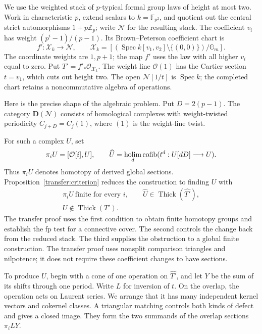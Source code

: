\documentclass[11pt]{article}
\DeclareMathOperator{\Thick}{Thick}
\DeclareMathOperator{\Spec}{Spec}
\newcommand{\Z}{\mathbb Z}
\newcommand{\F}{\mathbb F}
\theoremstyle{definition}
\theoremstyle{remark}
\numberwithin{equation}{section}
\begin{document}
We use the weighted stack of $p$-typical formal group laws of height at
most two. Work in characteristic $p$, extend scalars to $k=\F_{p^2}$,
and quotient out the central strict automorphisms $1+p\Z_p$; write
$\mathcal N$ for the resulting stack. The coefficient $v_i$ has weight
$(p^i-1)/(p-1)$. Its Brown--Peterson coefficient chart is
\[
 f':\mathcal X_k\longrightarrow\mathcal N,\qquad
 \mathcal X_k=
 [ (\Spec k[v_1,v_2]\setminus\{(0,0)\})/\mathbb G_m ].
\]
The coordinate weights are $1,p+1$; the map $f'$ uses the law with
all higher $v_i$ equal to zero.
Put $T'=f'_*\mathcal O_{\mathcal X_k}$.
The weight line $\mathcal O(1)$ has the Cartier section $t=v_1$, which cuts
out height two. The open $\mathcal N[1/t]$ is $\Spec k$;
the completed chart retains a noncommutative algebra of operations.

Here is the precise shape of the algebraic problem. Put $D=2(p-1)$.
The category $\mathbf D(\mathcal N)$ consists of homological complexes
with weight-twisted periodicity $C_{j+D}=C_j(1)$, where $(1)$ is the
weight-line twist.

For such a complex $U$, set
\[
 \pi_iU=[\mathcal O[i],U],\qquad
 \widehat U=\mathop{\rm holim}_d
       \operatorname{cofib}(t^d:U[dD]\longrightarrow U).
\]
Thus $\pi_iU$ denotes homotopy of derived global sections.
Proposition~\ref{transfer:criterion} reduces the construction to finding $U$ with
\begin{equation}\label{eq:target}
 \begin{gathered}
 \pi_iU\ \text{finite for every }i,\qquad
 \widehat U\in\Thick(\widehat{T'}),\\
 U\notin\Thick(T').
 \end{gathered}
\end{equation}
The transfer proof uses the first condition to obtain finite homotopy
groups and establish the fp test for a connective cover. The second
controls the change back from the reduced stack. The third supplies
the obstruction to a global finite construction. The transfer proof
uses nonsplit comparison triangles and nilpotence; it does not require
these coefficient changes to have sections.

To produce $U$, begin with a cone of one operation on
$\widehat{T'}$, and let $Y$ be the sum of its shifts through one
period. Write $L$ for inversion of $t$. On the overlap, the operation
acts on Laurent series. We arrange that it has many independent
kernel vectors and cokernel classes. A triangular matching controls
both kinds of defect and gives a closed image. They form the two
summands of the overlap sections $\pi_iLY$.
\end{document}
